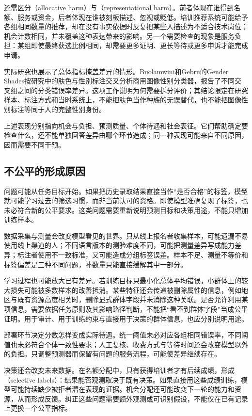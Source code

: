 还需区分（allocative harm）与（representational harm）。前者体现在谁得到名额、服务或资金，后者体现在谁被刻板描述、忽视或贬低。培训推荐系统可能给予各组相同数量的推荐，却在没有事实依据时反复把某些人描述为不适合技术岗位；机会计数相同，并未覆盖这种表达带来的影响。另一个需要检查的现象是服务负担：某组即使最终获选比例相同，却需要更多证明、更长等待或更多申诉才能完成申请。

实际研究也展示了总体指标掩盖差异的情形。Buolamwini和Gebru的Gender Shades按研究中的肤色与性别标注交叉分析商用图像性别分类器，报告了不同交叉组之间的分类错误率差异。这项工作说明为何需要拆分评价；其结论限定在研究样本、标注方式和当时系统上，不能把肤色当作种族的无误替代，也不能把图像性别标注等同于人的完整性别身份。

上述表现分别指向机会与负担、预测质量、个体待遇和社会表征。它们帮助确定要检查什么，还不能单独回答差异由哪个环节造成；同一种表现可能来自不同原因，因而需要不同干预。

\subsection{不公平的形成原因}
\label{sec:fairness-causes}

问题可能从任务目标开始。如果把历史录取结果直接当作“是否合格”的标签，模型就可能学习过去的筛选习惯，而非当前认可的资格。即使模型准确复现了标签，也未必符合新的公平要求。这类问题需要重新说明预测目标和决策用途，不能只增加训练样本。

数据采集与测量会改变模型看见的世界。只从线上报名者收集样本，可能遗漏不易使用线上渠道的人；不同语言版本的测验难度不同，可能把测量差异写成能力差异；标注者使用不一致标准，又可能造成分组标签误差。样本不足、测量不等价和标签偏差是三种不同问题，补数量只能直接缓解其中一部分。

学习过程也可能放大已有差异。若训练目标只最小化总体平均错误，小群体上的较大损失可能被多数样本的改善抵消。某些特征还会传递被删除属性的信息，例如地区与既有资源高度相关时，删除显式群体字段并未消除这种关联。是否允许利用某项信息，需要依据任务原则及其影响路径判断，不能把“看不到群体字段”当成公平证明。用于审计、用于训练约束与直接用于决策的群体信息，也应分别说明用途。

部署环节决定分数怎样变成实际待遇。统一阈值未必对应各组相同错误率，不同阈值也未必符合个体一致性要求；人工复核、收费方式与等待时间还会改变模型以外的负担。只调整预测器而保留有问题的服务流程，可能使差异继续存在。

决策还会改变未来数据。在名额分配中，只有获得培训者才有后续成绩，形成（selective labels）：结果能否观测取决于既有决策。如果直接用这些成绩训练，模型可能持续缺少被拒者潜在表现的证据。机会分配还可能改变下一轮的能力和资源，从而形成反馈。纠正这些问题需要额外观测或可识别假设，不能仅在已有记录上更换一个公平指标。

